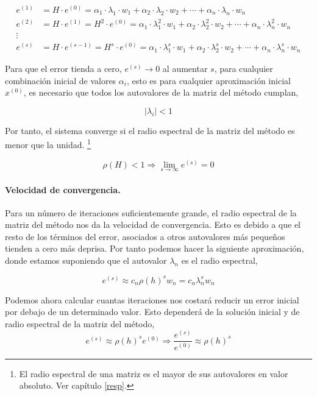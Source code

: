\begin{align*}
e^{(1)}&=H\cdot e^{(0)}=\alpha_1\cdot \lambda_1 \cdot  w_1+\alpha_2\cdot \lambda_2 \cdot  w_2+\cdots+\alpha_n\cdot \lambda_n \cdot w_n\\
e^{(2)}&=H\cdot e^{(1)}=H^2\cdot e^{(0)}=\alpha_1\cdot \lambda_1^2 \cdot  w_1+\alpha_2\cdot \lambda_2^2 \cdot  w_2+\cdots+\alpha_n\cdot \lambda_n^2 \cdot w_n\\
\vdots \ \ \ & \\
e^{(s)}&=H\cdot e^{(s-1)}=H^s\cdot e^{(0)}=\alpha_1\cdot \lambda_1^s \cdot  w_1+\alpha_2\cdot \lambda_2^s \cdot  w_2+\cdots+\alpha_n\cdot \lambda_n^s \cdot w_n
\end{align*}

Para que el error tienda a cero, $e^{(s)}\rightarrow 0$ al aumentar $s$, para cualquier combinación inicial de valores $\alpha_i$, esto es para cualquier aproximación inicial $x^{(0)}$, es necesario que todos los autovalores de la matriz del método cumplan,

\begin{equation*}
\vert \lambda_i \vert < 1
\end{equation*}

Por tanto, el sistema converge si el radio espectral de la matriz del método es menor que la unidad. \footnote{El radio espectral de una matriz es el mayor de sus autovalores en valor absoluto. Ver capítulo \ref{resp}.}

\begin{equation*}
\rho(H)<1 \Rightarrow \lim_{s\rightarrow \infty}e^{(s)}=0
\end{equation*}

\paragraph{Velocidad de convergencia.} Para un número de iteraciones suficientemente grande, el radio espectral de la matriz del método nos da la velocidad de convergencia. Esto es debido a que el resto de los términos del error, asociados a otros autovalores más pequeños tienden a cero más  deprisa. Por tanto podemos hacer la siguiente aproximación, donde estamos suponiendo que el autovalor $\lambda_n$ es el radio espectral,

\begin{equation*}
e^{(s)}\approx c_n \rho(h)^s w_n= c_n \lambda_n^s w_n
\end{equation*}

Podemos ahora calcular cuantas iteraciones nos costará reducir un error inicial por debajo de un determinado valor. Esto dependerá de la solución inicial y de radio espectral de la matriz del método,
\begin{equation*}
e^{(s)}\approx  \rho(h)^s e^{(0)} \Rightarrow \frac{e^{(s)}}{e^{(0)}} \approx \rho(h)^s
\end{equation*}

